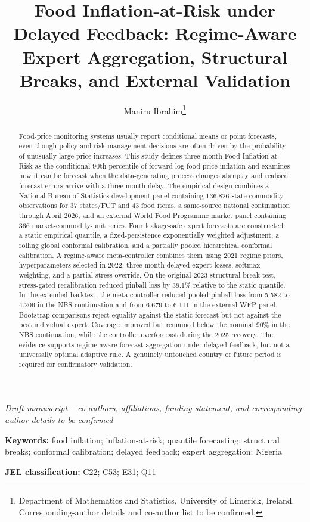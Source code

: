 \documentclass[
  11pt,
  a4paper,
]{article}
\title{Food Inflation-at-Risk under Delayed Feedback: Regime-Aware
Expert Aggregation, Structural Breaks, and External Validation}
\author{Maniru Ibrahim\thanks{Department of Mathematics and Statistics,
University of Limerick, Ireland. Corresponding-author details and
co-author list to be confirmed.}}
\date{}
\begin{document}
\maketitle
\begin{abstract}
Food-price monitoring systems usually report conditional means or point
forecasts, even though policy and risk-management decisions are often
driven by the probability of unusually large price increases. This study
defines three-month Food Inflation-at-Risk as the conditional 90th
percentile of forward log food-price inflation and examines how it can
be forecast when the data-generating process changes abruptly and
realised forecast errors arrive with a three-month delay. The empirical
design combines a National Bureau of Statistics development panel
containing 136,826 state-commodity observations for 37 states/FCT and 43
food items, a same-source national continuation through April 2026, and
an external World Food Programme market panel containing 366
market-commodity-unit series. Four leakage-safe expert forecasts are
constructed: a static empirical quantile, a fixed-persistence
exponentially weighted adjustment, a rolling global conformal
calibration, and a partially pooled hierarchical conformal calibration.
A regime-aware meta-controller combines them using 2021 regime priors,
hyperparameters selected in 2022, three-month-delayed expert losses,
softmax weighting, and a partial stress override. On the original 2023
structural-break test, stress-gated recalibration reduced pinball loss
by 38.1\% relative to the static quantile. In the extended backtest, the
meta-controller reduced pooled pinball loss from 5.582 to 4.206 in the
NBS continuation and from 6.679 to 6.111 in the external WFP panel.
Bootstrap comparisons reject equality against the static forecast but
not against the best individual expert. Coverage improved but remained
below the nominal 90\% in the NBS continuation, while the controller
overforecast during the 2025 recovery. The evidence supports
regime-aware forecast aggregation under delayed feedback, but not a
universally optimal adaptive rule. A genuinely untouched country or
future period is required for confirmatory validation.
\end{abstract}

\begin{center}
\emph{Draft manuscript -- co-authors, affiliations, funding statement, and corresponding-author details to be confirmed}
\end{center}

\noindent\textbf{Keywords:} food inflation; inflation-at-risk; quantile
forecasting; structural breaks; conformal calibration; delayed feedback;
expert aggregation; Nigeria

\noindent\textbf{JEL classification:} C22; C53; E31; Q11












\end{document}
